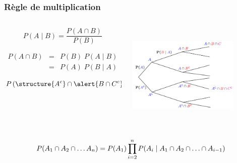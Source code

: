 \documentclass{beamer}
\begin{document}
\begin{frame}[t]
    \frametitle{Règle de multiplication}
   \begin{columns}
       \begin{column}{0.4\textwidth}
          \scriptsize 
           \begin{equation*}
               P(A\;|\;B)  = \frac{ P(A\cap B)}{ P(B)}
           \end{equation*}
           {

               \begin{eqnarray*}
                   P(A\cap B) & = & P(B)\;P(A\;|\;B) \\
                              & = & P(A)\;P(B\;|\; A)
               \end{eqnarray*}
           }
           {
               \begin{equation*}
                   P\left(\structure{A^c}\cap \alert{B \cap C^c}\right)=
               \end{equation*}
           }
       \end{column}
       \begin{column}{0.6\textwidth}
           
           {
                   \centering
                   \includegraphics[width=0.8\textwidth, height=5cm]{./tree_event_multiplication.png}
           }
       \end{column}
   \end{columns} 

   \vspace*{1cm}
       {
           \scriptsize
           \begin{equation*}
               \scriptsize
               P(A_1\cap A_2\cap\ldots A_n) = P(A_1)\prod_{i=2}^n P(A_i\;|\;
               A_1\cap A_2\cap\ldots\cap A_{i-1})
           \end{equation*}
       }

\end{frame}
\end{document}
